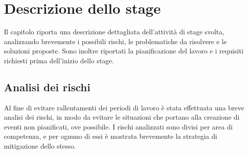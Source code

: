 
\chapter{Descrizione dello stage}
\label{cap:descrizione-stage}

Il capitolo riporta una descrizione dettagliata dell'attività di stage svolta, analizzando brevemente i possibili rischi, le problematiche da risolvere e le soluzioni proposte. Sono inoltre riportati la pianificazione del lavoro e i requisiti richiesti prima dell'inizio dello stage. 

\section{Analisi dei rischi}

Al fine di evitare rallentamenti dei periodi di lavoro è stata effettuata una breve analisi dei
rischi, in modo da evitare le situazioni che portano alla creazione di eventi non pianificati,
ove possibile. 
I rischi analizzati sono divisi per area di competenza, e per ognuno di essi è mostrata brevemente la strategia di mitigazione dello stesso.

